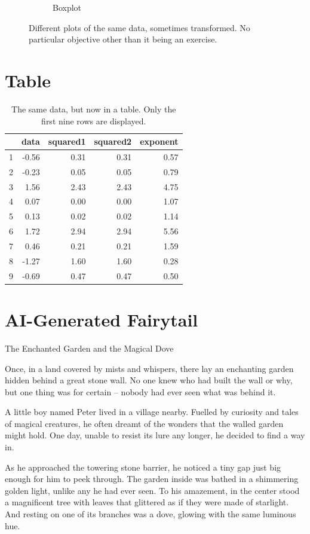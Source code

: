\documentclass[12pt]{article}
\begin{document}
\begin{figure}[H]
\begin{subfigure}[b]{0.3\textwidth}
         \caption{Boxplot}
         \label{fig:Box}
     \end{subfigure}
        \caption{Different plots of the same data, sometimes transformed. No particular objective other than it being an exercise.}
        \label{fig:four graphs}
\end{figure}

\section{Table}
\begin{table}[ht]
\centering
\begin{tabular}{rrrrr}
  \hline
 & data & squared1 & squared2 & exponent \\ 
  \hline
1 & -0.56 & 0.31 & 0.31 & 0.57 \\ 
  2 & -0.23 & 0.05 & 0.05 & 0.79 \\ 
  3 & 1.56 & 2.43 & 2.43 & 4.75 \\ 
  4 & 0.07 & 0.00 & 0.00 & 1.07 \\ 
  5 & 0.13 & 0.02 & 0.02 & 1.14 \\ 
  6 & 1.72 & 2.94 & 2.94 & 5.56 \\ 
  7 & 0.46 & 0.21 & 0.21 & 1.59 \\ 
  8 & -1.27 & 1.60 & 1.60 & 0.28 \\ 
  9 & -0.69 & 0.47 & 0.47 & 0.50 \\ 
   \hline
\end{tabular}
\caption{The same data, but now in a table. Only the first nine rows are displayed.}
\end{table}

\section{AI-Generated Fairytail}
The Enchanted Garden and the Magical Dove

Once, in a land covered by mists and whispers, there lay an enchanting garden hidden behind a great stone wall. No one knew who had built the wall or why, but one thing was for certain – nobody had ever seen what was behind it.

A little boy named Peter lived in a village nearby. Fuelled by curiosity and tales of magical creatures, he often dreamt of the wonders that the walled garden might hold. One day, unable to resist its lure any longer, he decided to find a way in.

As he approached the towering stone barrier, he noticed a tiny gap just big enough for him to peek through. The garden inside was bathed in a shimmering golden light, unlike any he had ever seen. To his amazement, in the center stood a magnificent tree with leaves that glittered as if they were made of starlight. And resting on one of its branches was a dove, glowing with the same luminous hue.
\end{document}
